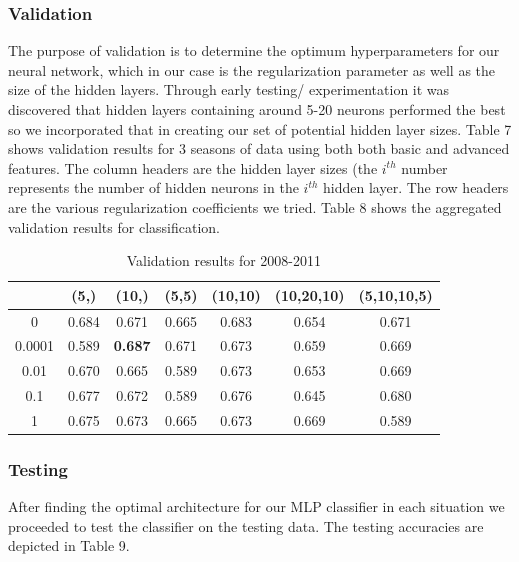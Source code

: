\documentclass{article}
\begin{document}
\subsubsection{Validation}
The purpose of validation is to determine the optimum hyperparameters for our neural network, which in our case is the regularization parameter as well as the size of the hidden layers. Through early testing/ experimentation it was discovered that hidden layers containing around 5-20 neurons performed the best so we incorporated that in creating our set of potential hidden layer sizes. Table 7 shows validation results for 3 seasons of data using both both basic and advanced features. The column headers are the hidden layer sizes (the $i^{th}$ number represents the number of hidden neurons in the $i^{th}$ hidden layer. The row headers are the various regularization coefficients we tried. Table 8 shows the aggregated validation results for classification.

\begin{table}
  \begin{center}
    \begin{tabular}{ | c | c | c | c | c | c | c |}
      \hline
            &             	(5,) & 	(10,) & 	(5,5) &  	(10,10) & 	(10,20,10) & 	(5,10,10,5)  \\ \hline
	0  &     	0.684 & 	0.671&	0.665&	0.683&	0.654&		0.671	    \\ \hline
	0.0001 &   0.589 &     \textbf{0.687}&	0.671&	0.673&	0.659&		0.669	    \\ \hline
	0.01  &    	0.670 &     0.665&	0.589&	0.673&	0.653&		0.669	    \\ \hline
	0.1	&	0.677&	0.672&	0.589&	0.676&	0.645&		0.680	    \\ \hline
	1&		0.675&	0.673&	0.665&	0.673&	0.669&		0.589	    \\ \hline

    \end{tabular}
  \end{center}
  \caption{Validation results for 2008-2011}
\end{table}



\subsubsection{Testing}

After finding the optimal architecture for our MLP classifier in each situation we proceeded to test the classifier on the testing data. The testing accuracies are depicted in Table 9.
\end{document}
